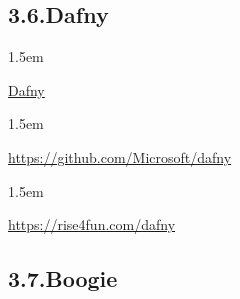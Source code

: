 \documentclass[12pt,twoside]{article}
\begin{document}
\subsection{3.6.\hspace*{0.5em}Dafny}%

\begin{mddefinitions}%


\begin{mdbmarginx}{}{}{}{1.5em}%
\begin{mddefdata}%
\href{https://www.microsoft.com/en-us/research/project/dafny-a-language-and-program-verifier-for-functional-correctness}{Dafny}
\end{mddefdata}%
\end{mdbmarginx}%


\begin{mdbmarginx}{}{}{}{1.5em}%
\begin{mddefdata}%
\href{https://github.com/Microsoft/dafny}{{\ttfamily https://\hspace{0pt}github.\hspace{0pt}com/\hspace{0pt}Microsoft/\hspace{0pt}dafny}}
\end{mddefdata}%
\end{mdbmarginx}%


\begin{mdbmarginx}{}{}{}{1.5em}%
\begin{mddefdata}%
\href{https://rise4fun.com/dafny}{{\ttfamily https://\hspace{0pt}rise4fun.\hspace{0pt}com/\hspace{0pt}dafny}}%
\end{mddefdata}%
\end{mdbmarginx}%
\end{mddefinitions}%

\subsection{3.7.\hspace*{0.5em}Boogie}%
\end{document}
